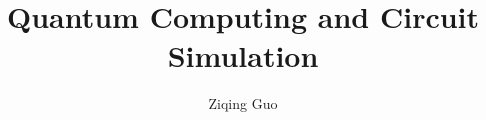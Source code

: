 \documentclass[dissertation,doublespacing,leftmargin15]{ttuthesis}
\title{Quantum Computing and Circuit Simulation}   %
\author{Ziqing Guo}
\begin{document}
\maketitlepage
\makecopyrightpage

\ttutableofcontents

\ttulistoftables
\ttulistoffigures


\ttumainmatter








\ttureferences
\ttuappendices


\end{document}
